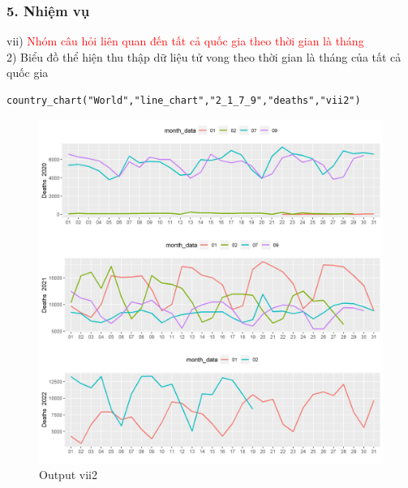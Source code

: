 \documentclass[english,10pt,table]{beamer}
\begin{document}
\begin{frame}[fragile]
\frametitle{5.  Nhiệm vụ}
vii) \textcolor{red}{Nhóm câu hỏi liên quan đến tất cả quốc gia theo thời gian là tháng }\\
      2) Biểu đồ thể hiện thu thập dữ liệu tử vong theo thời gian là tháng của tất cả quốc gia
\begin{lstlisting}[frame = single,basicstyle=\tiny]
country_chart("World","line_chart","2_1_7_9","deaths","vii2")
		\end{lstlisting}
			\begin{figure}[h!]
	\begin{center}
		    \includegraphics[scale = 0.23]{Images/VII/vii2 World .jpeg}
		     \caption{Output vii2}
		\end{center}
		\end{figure}
\end{frame}
\end{document}
